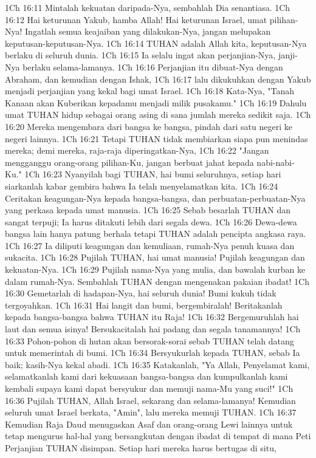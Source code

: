 1Ch 16:11  Mintalah kekuatan daripada-Nya, sembahlah Dia senantiasa.
1Ch 16:12  Hai keturunan Yakub, hamba Allah! Hai keturunan Israel, umat pilihan-Nya! Ingatlah semua keajaiban yang dilakukan-Nya, jangan melupakan keputusan-keputusan-Nya.
1Ch 16:14  TUHAN adalah Allah kita, keputusan-Nya berlaku di seluruh dunia.
1Ch 16:15  Ia selalu ingat akan perjanjian-Nya, janji-Nya berlaku selama-lamanya.
1Ch 16:16  Perjanjian itu dibuat-Nya dengan Abraham, dan kemudian dengan Ishak,
1Ch 16:17  lalu dikukuhkan dengan Yakub menjadi perjanjian yang kekal bagi umat Israel.
1Ch 16:18  Kata-Nya, "Tanah Kanaan akan Kuberikan kepadamu menjadi milik pusakamu."
1Ch 16:19  Dahulu umat TUHAN hidup sebagai orang asing di sana jumlah mereka sedikit saja.
1Ch 16:20  Mereka mengembara dari bangsa ke bangsa, pindah dari satu negeri ke negeri lainnya.
1Ch 16:21  Tetapi TUHAN tidak membiarkan siapa pun menindas mereka; demi mereka, raja-raja diperingatkan-Nya,
1Ch 16:22  "Jangan mengganggu orang-orang pilihan-Ku, jangan berbuat jahat kepada nabi-nabi-Ku."
1Ch 16:23  Nyanyilah bagi TUHAN, hai bumi seluruhnya, setiap hari siarkanlah kabar gembira bahwa Ia telah menyelamatkan kita.
1Ch 16:24  Ceritakan keagungan-Nya kepada bangsa-bangsa, dan perbuatan-perbuatan-Nya yang perkasa kepada umat manusia.
1Ch 16:25  Sebab besarlah TUHAN dan sangat terpuji; Ia harus ditakuti lebih dari segala dewa.
1Ch 16:26  Dewa-dewa bangsa lain hanya patung berhala tetapi TUHAN adalah pencipta angkasa raya.
1Ch 16:27  Ia diliputi keagungan dan kemuliaan, rumah-Nya penuh kuasa dan sukacita.
1Ch 16:28  Pujilah TUHAN, hai umat manusia! Pujilah keagungan dan kekuatan-Nya.
1Ch 16:29  Pujilah nama-Nya yang mulia, dan bawalah kurban ke dalam rumah-Nya. Sembahlah TUHAN dengan mengenakan pakaian ibadat!
1Ch 16:30  Gemetarlah di hadapan-Nya, hai seluruh dunia! Bumi kukuh tidak tergoyahkan.
1Ch 16:31  Hai langit dan bumi, bergembiralah! Beritakanlah kepada bangsa-bangsa bahwa TUHAN itu Raja!
1Ch 16:32  Bergemuruhlah hai laut dan semua isinya! Bersukacitalah hai padang dan segala tanamannya!
1Ch 16:33  Pohon-pohon di hutan akan bersorak-sorai sebab TUHAN telah datang untuk memerintah di bumi.
1Ch 16:34  Bersyukurlah kepada TUHAN, sebab Ia baik; kasih-Nya kekal abadi.
1Ch 16:35  Katakanlah, "Ya Allah, Penyelamat kami, selamatkanlah kami dari kekuasaan bangsa-bangsa dan kumpulkanlah kami kembali supaya kami dapat bersyukur dan memuji nama-Mu yang suci!"
1Ch 16:36  Pujilah TUHAN, Allah Israel, sekarang dan selama-lamanya! Kemudian seluruh umat Israel berkata, "Amin", lalu mereka memuji TUHAN.
1Ch 16:37  Kemudian Raja Daud menugaskan Asaf dan orang-orang Lewi lainnya untuk tetap mengurus hal-hal yang bersangkutan dengan ibadat di tempat di mana Peti Perjanjian TUHAN disimpan. Setiap hari mereka harus bertugas di situ,
